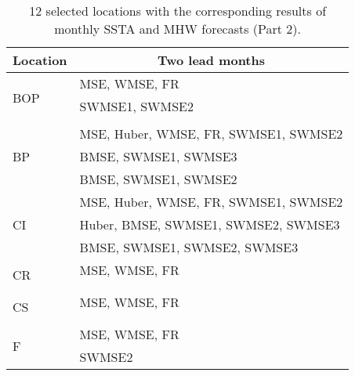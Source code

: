 \documentclass[11pt, a4paper]{article}
\begin{document}
\begin{table}[H]
\centering
\footnotesize
\caption{12 selected locations with the corresponding results of monthly SSTA and MHW forecasts (Part 2).}
\begin{tabular}{ll}
\multicolumn{1}{c}{\textbf{Location}} & \multicolumn{1}{c}{\textbf{Two lead months}}       \\ \hline
\multirow{3}{*}{BOP}                  & MSE, WMSE, FR                                      \\
                                      & SWMSE1, SWMSE2                                     \\
                                      &                                                    \\ \hline
\multirow{3}{*}{BP}                   & MSE, Huber, WMSE, FR, SWMSE1, SWMSE2               \\
                                      & BMSE, SWMSE1, SWMSE3                               \\
                                      & BMSE, SWMSE1, SWMSE2                               \\ \hline
\multirow{3}{*}{CI}                   & MSE, Huber, WMSE, FR, SWMSE1, SWMSE2               \\
                                      & Huber, BMSE, SWMSE1, SWMSE2, SWMSE3                \\
                                      & BMSE, SWMSE1, SWMSE2, SWMSE3                       \\ \hline
\multirow{3}{*}{CR}                   & MSE, WMSE, FR                                      \\
                                      &                                                    \\
                                      &                                                    \\ \hline
\multirow{3}{*}{CS}                   & MSE, WMSE, FR                                      \\
                                      &                                                    \\
                                      &                                                    \\ \hline
\multirow{3}{*}{F}                    & MSE, WMSE, FR                                      \\
                                      & SWMSE2                                             \\

\end{tabular}
\end{table}
\end{document}
